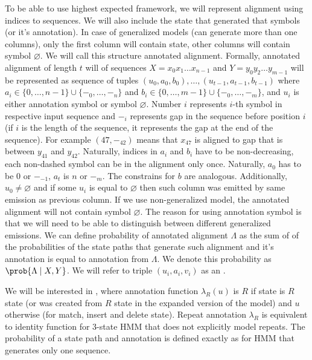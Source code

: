 To be able to use highest expected framework, we will represent alignment using
indices to sequences. We will also include the state that generated that
symbols (or it's annotation). In case of generalized models (can generate more
than one columns), only the first column will contain state, other columns will
contain symbol $\varnothing$. We will call this structure annotated alignment.
Formally, annotated alignment of length $t$ will of sequences $X=x_0x_1\dots
x_{n-1}$ and $Y=y_0y_2\dots y_{m-1}$ will be represented as sequence of tuples
$(u_0, a_0, b_0), \dots, (u_{t-1}, a_{t-1}, b_{t-1})$ where $a_i\in \{0, \dots,
{n-1}\}\cup\{-_0, \dots, -_n\}$ and $b_i \in \{0, \dots, m-1\}\cup\{-_0,
\dots, -_m\}$, and $u_i$ is either annotation symbol or symbol $\varnothing$.
Number $i$ represents $i$-th symbol in respective input sequence and $-_i$
represents gap in the sequence before position $i$ (if $i$ is the length of the
sequence, it represents the gap at the end of the sequence). For example $(47,
-_{42})$ means that $x_{47}$ is aligned to gap that is between $y_{41}$ and
$y_{42}$.  Naturally, indices in $a_i$ and $b_i$ have to be non-decreasing,
each non-dashed symbol can be in the alignment only once.  Naturally, $a_0$ has
to be $0$ or $-_{-1}$, $a_t$ is $n$ or $-_m$. The constrains for $b$ are
analogous. Additionally, $u_0\not=\varnothing$ and if some $u_i$ is equal to
$\varnothing$ then such column was emitted by same emission as previous column.
If we use non-generalized model, the annotated alignment will not contain
symbol $\varnothing$. The reason for using annotation symbol is that we will
need to be able to distinguish between different generalized emissions. We can
define probability of annotated alignment $\Lambda$ as the sum of of the
probabilities of the state paths that generate such alignment and it's
annotation is equal to annotation from $\Lambda$. We denote this probability as
$\prob{\Lambda\mid X, Y}$. We will refer to triple $(u_i, a_i, v_i)$ as an
.

We will be interested in , where annotation
function $\lambda_R(u)$ is $R$ if state is $R$ state (or was created from $R$
state in the expanded version of the model) and $u$ otherwise (for match,
insert and delete state). Repeat annotation $\lambda_R$ is equivalent to
identity function for 3-state HMM that does not explicitly model repeats.
The probability of a state path and annotation is defined exactly as for HMM
that generates only one sequence.

